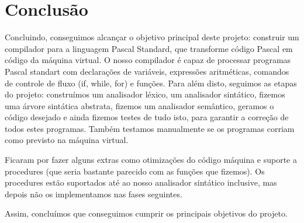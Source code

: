 \documentclass[12pt,a4paper]{report}
\begin{document}
\chapter{Conclusão}

Concluindo, conseguimos alcançar o objetivo principal deste projeto: construir um compilador para a linguagem Pascal Standard, que transforme código Pascal em código da máquina virtual.
O nosso compilador é capaz de processar programas Pascal standart com declarações de variáveis, expressões aritméticas, comandos de controle de fluxo (if, while, for) e funções. Para além disto,
seguimos as etapas do projeto: construímos um analisador léxico, um analisador sintático, fizemos uma árvore sintática abstrata, fizemos um analisador semântico, geramos o código desejado
e ainda fizemos testes de tudo isto, para garantir a correção de todos estes programas. Também testamos manualmente se os programas corriam como previsto na máquina virtual.

\vspace{1em}

Ficaram por fazer alguns extras como otimizações do código máquina e suporte a procedures (que seria bastante parecido
com as funções que fizemos).
Os procedures estão suportados até ao nosso analisador sintático inclusive, mas depois não os implementamos nas fases seguintes.

\vspace{1em}

Assim, concluímos que conseguimos cumprir os principais objetivos do projeto. 
\end{document}
